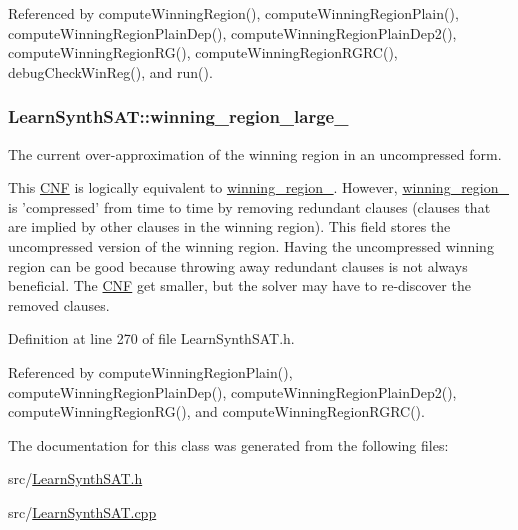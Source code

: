 Referenced by compute\-Winning\-Region(), compute\-Winning\-Region\-Plain(), compute\-Winning\-Region\-Plain\-Dep(), compute\-Winning\-Region\-Plain\-Dep2(), compute\-Winning\-Region\-R\-G(), compute\-Winning\-Region\-R\-G\-R\-C(), debug\-Check\-Win\-Reg(), and run().

\hypertarget{classLearnSynthSAT_aaa79e8772e9ce8e59dc14e3bb1784256}{
\subsubsection[{winning\-\_\-region\-\_\-large\-\_\-}]{ Learn\-Synth\-S\-A\-T\-::winning\-\_\-region\-\_\-large\-\_\-\hspace{0.3cm}{\ttfamily [protected]}}}\label{classLearnSynthSAT_aaa79e8772e9ce8e59dc14e3bb1784256}


The current over-\/approximation of the winning region in an uncompressed form. 

This \hyperlink{classCNF}{C\-N\-F} is logically equivalent to \hyperlink{classLearnSynthSAT_aced2bce789c7a93ed4b5391dd0690616}{winning\-\_\-region\-\_\-}. However, \hyperlink{classLearnSynthSAT_aced2bce789c7a93ed4b5391dd0690616}{winning\-\_\-region\-\_\-} is 'compressed' from time to time by removing redundant clauses (clauses that are implied by other clauses in the winning region). This field stores the uncompressed version of the winning region. Having the uncompressed winning region can be good because throwing away redundant clauses is not always beneficial. The \hyperlink{classCNF}{C\-N\-F} get smaller, but the solver may have to re-\/discover the removed clauses. 

Definition at line 270 of file Learn\-Synth\-S\-A\-T.\-h.



Referenced by compute\-Winning\-Region\-Plain(), compute\-Winning\-Region\-Plain\-Dep(), compute\-Winning\-Region\-Plain\-Dep2(), compute\-Winning\-Region\-R\-G(), and compute\-Winning\-Region\-R\-G\-R\-C().



The documentation for this class was generated from the following files\-:\begin{DoxyCompactItemize}
\item 
src/\hyperlink{LearnSynthSAT_8h}{Learn\-Synth\-S\-A\-T.\-h}\item 
src/\hyperlink{LearnSynthSAT_8cpp}{Learn\-Synth\-S\-A\-T.\-cpp}\end{DoxyCompactItemize}
